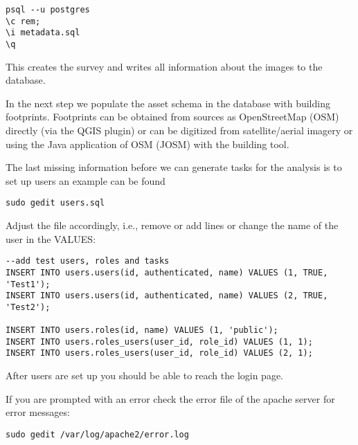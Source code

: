 \documentclass{article}
\begin{document}
\begin{verbatim}
psql --u postgres
\c rem;
\i metadata.sql
\q
\end{verbatim}
This creates the survey and writes all information about the images 
to the database.

In the next step we populate the asset schema in the database 
with building footprints. Footprints can be obtained from
sources as OpenStreetMap (OSM) directly (via the QGIS plugin)
 or can be digitized from 
satellite/aerial imagery or using the Java application of OSM
(JOSM) with the building tool.


The last missing information before we can generate tasks
for the analysis is to set up users an example can be found
\begin{verbatim}
sudo gedit users.sql
\end{verbatim}

Adjust the file accordingly, i.e., remove or add lines or change the
name of the user in the VALUES: 
\begin{verbatim}
--add test users, roles and tasks
INSERT INTO users.users(id, authenticated, name) VALUES (1, TRUE, 'Test1');
INSERT INTO users.users(id, authenticated, name) VALUES (2, TRUE, 'Test2');

INSERT INTO users.roles(id, name) VALUES (1, 'public');
INSERT INTO users.roles_users(user_id, role_id) VALUES (1, 1);
INSERT INTO users.roles_users(user_id, role_id) VALUES (2, 1);
\end{verbatim}


After users are set up you should be able to reach the login
page.

If you are prompted with an error check the error file of the apache
server for error messages:

\begin{verbatim}
sudo gedit /var/log/apache2/error.log
\end{verbatim}
\end{document}
